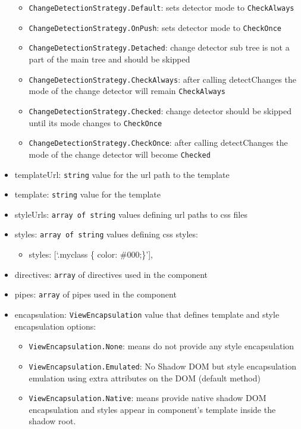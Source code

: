 \documentclass[12pt,]{article}
\providecommand{\tightlist}{%
  \setlength{\itemsep}{0pt}\setlength{\parskip}{0pt}}
\begin{document}
\begin{itemize}
  \begin{itemize}
  \tightlist
  \item
    \texttt{ChangeDetectionStrategy.Default}: sets detector mode to
    \texttt{CheckAlways}
  \item
    \texttt{ChangeDetectionStrategy.OnPush}: sets detector mode to
    \texttt{CheckOnce}
  \item
    \texttt{ChangeDetectionStrategy.Detached}: change detector sub tree
    is not a part of the main tree and should be skipped
  \item
    \texttt{ChangeDetectionStrategy.CheckAlways}: after calling
    detectChanges the mode of the change detector will remain
    \texttt{CheckAlways}
  \item
    \texttt{ChangeDetectionStrategy.Checked}: change detector should be
    skipped until its mode changes to \texttt{CheckOnce}
  \item
    \texttt{ChangeDetectionStrategy.CheckOnce}: after calling
    detectChanges the mode of the change detector will become
    \texttt{Checked}
  \end{itemize}
\item
  templateUrl: \texttt{string} value for the url path to the template
\item
  template: \texttt{string} value for the template
\item
  styleUrls: \texttt{array\ of\ string} values defining url paths to css
  files
\item
  styles: \texttt{array\ of\ string} values defining css styles:

  \begin{itemize}
  \tightlist
  \item
    styles: {[}`.myclass \{ color: \#000;\}'{]},
  \end{itemize}
\item
  directives: \texttt{array} of directives used in the component
\item
  pipes: \texttt{array} of pipes used in the component
\item
  encapsulation: \texttt{ViewEncapsulation} value that defines template
  and style encapsulation options:

  \begin{itemize}
  \tightlist
  \item
    \texttt{ViewEncapsulation.None}: means do not provide any style
    encapsulation
  \item
    \texttt{ViewEncapsulation.Emulated}: No Shadow DOM but style
    encapsulation emulation using extra attributes on the DOM (default
    method)
  \item
    \texttt{ViewEncapsulation.Native}: means provide native shadow DOM
    encapsulation and styles appear in component's template inside the
    shadow root.
  \end{itemize}
\end{itemize}
\end{document}
